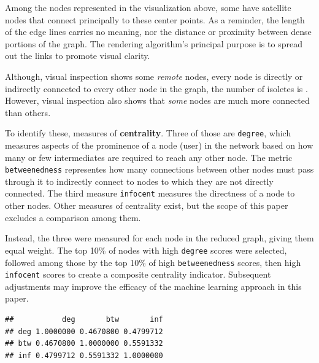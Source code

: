 \documentclass[]{article}
\newenvironment{Shaded}{\begin{snugshade}}{\end{snugshade}}
\newcommand{\KeywordTok}[1]{\textcolor[rgb]{0.13,0.29,0.53}{\textbf{#1}}}
\newcommand{\NormalTok}[1]{#1}
\newcommand{\OperatorTok}[1]{\textcolor[rgb]{0.81,0.36,0.00}{\textbf{#1}}}
\newcommand{\StringTok}[1]{\textcolor[rgb]{0.31,0.60,0.02}{#1}}
\begin{document}
Among the nodes represented in the visualization above, some have
satellite nodes that connect principally to these center points. As a
reminder, the length of the edge lines carries no meaning, nor the
distance or proximity between dense portions of the graph. The rendering
algorithm's principal purpose is to spread out the links to promote
visual clarity.

Although, visual inspection shows some \emph{remote} nodes, every node
is directly or indirectly connected to every other node in the graph,
the number of isoletes is . However, visual inspection also shows that
\emph{some} nodes are much more connected than others.

To identify these, measures of \textbf{centrality}. Three of those are
\texttt{degree}, which measures aspects of the prominence of a node
(user) in the network based on how many or few intermediates are
required to reach any other node. The metric \texttt{betweenedness}
representes how many connections between other nodes must pass through
it to indirectly connect to nodes to which they are not directly
connected. The third measure \texttt{infocent} measures the directness
of a node to other nodes. Other measures of centrality exist, but the
scope of this paper excludes a comparison among them.

Instead, the three were measured for each node in the reduced graph,
giving them equal weight. The top 10\% of nodes with high
\texttt{degree} scores were selected, followed among those by the top
10\% of high \texttt{betweenedness} scores, then high \texttt{infocent}
scores to create a composite centrality indicator. Subsequent
adjustments may improve the efficacy of the machine learning approach in
this paper.

\begin{Shaded}
\end{Shaded}

\begin{verbatim}
##           deg       btw       inf
## deg 1.0000000 0.4670800 0.4799712
## btw 0.4670800 1.0000000 0.5591332
## inf 0.4799712 0.5591332 1.0000000
\end{verbatim}
\end{document}
